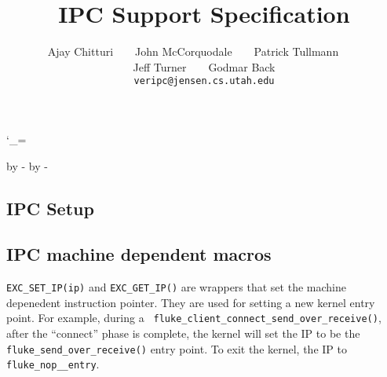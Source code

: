 %
%
%



\long{}
\long{}

\catcode`\_=\active



\topmargin 0pt
\advance \topmargin by -\headheight
\advance \topmargin by -\headsep
\textheight 8.9in
\oddsidemargin 0.3in
\evensidemargin \oddsidemargin
\marginparwidth 0.5in
\textwidth 6in

%

\title{\Large \bf IPC Support Specification}

\author{Ajay Chitturi~~~~John McCorquodale~~~~Patrick Tullmann~~~~\\
        Jeff Turner~~~~Godmar Back \\[2ex]
        {\tt veripc@jensen.cs.utah.edu}
        }



\maketitle



\subsection{IPC Setup}


\subsection{IPC machine dependent macros}

{\tt EXC_SET_IP(ip)} and {\tt EXC_GET_IP()} are wrappers that set the
machine depenedent instruction pointer.  They are used for setting a
new kernel entry point.  For example, during a {\tt
fluke_client_connect_send_over_receive()}, after the ``connect'' phase
is complete, the kernel will set the IP to be the {\tt
fluke_send_over_receive()} entry point.  To exit the kernel, 
the IP to {\tt fluke_nop__entry}.

